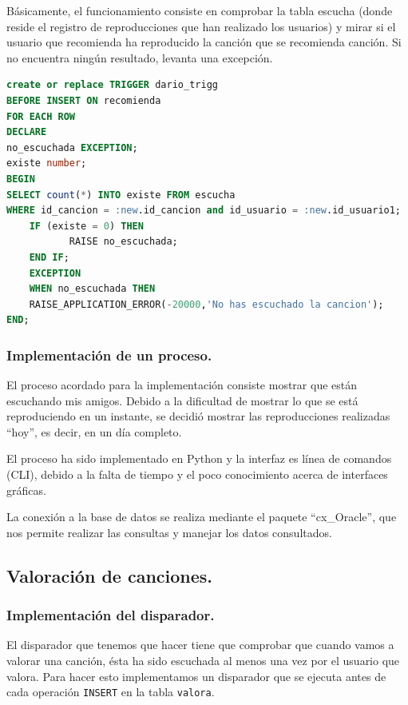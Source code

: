 \documentclass[12pt,a4paper]{article}
\begin{document}
	Básicamente, el funcionamiento consiste en comprobar la tabla escucha (donde reside el registro de reproducciones que han realizado los usuarios) y mirar si el usuario que recomienda ha reproducido la canción que se recomienda canción. Si no encuentra ningún resultado, levanta una excepción.

\begin{lstlisting}[language=SQL]
create or replace TRIGGER dario_trigg
BEFORE INSERT ON recomienda
FOR EACH ROW
DECLARE
no_escuchada EXCEPTION;
existe number;
BEGIN
SELECT count(*) INTO existe FROM escucha 
WHERE id_cancion = :new.id_cancion and id_usuario = :new.id_usuario1;
    IF (existe = 0) THEN
           RAISE no_escuchada;
    END IF;
    EXCEPTION
    WHEN no_escuchada THEN
    RAISE_APPLICATION_ERROR(-20000,'No has escuchado la cancion');
END;
\end{lstlisting}
\subsubsection{Implementación de un proceso.}
	El proceso acordado para la implementación consiste mostrar que están escuchando mis amigos. Debido a la dificultad de mostrar lo que se está reproduciendo en un instante, se decidió mostrar las reproducciones realizadas ``hoy'', es decir, en un día completo.
	
	El proceso ha sido implementado en Python y la interfaz es línea de comandos (CLI), debido a la falta de tiempo y el poco conocimiento acerca de interfaces gráficas. 
	
	La conexión a la base de datos se realiza mediante el paquete ``cx\_Oracle'', que nos permite realizar las consultas y manejar los datos consultados.




\newpage
\subsection{Valoración de canciones.}
\subsubsection{Implementación del disparador.}
El disparador que tenemos que hacer tiene que comprobar que cuando vamos a valorar una canción, ésta ha sido escuchada al menos una vez por el usuario que valora. Para hacer esto implementamos un disparador que se ejecuta antes de cada operación \texttt{INSERT} en la tabla \texttt{valora}.
\end{document}
